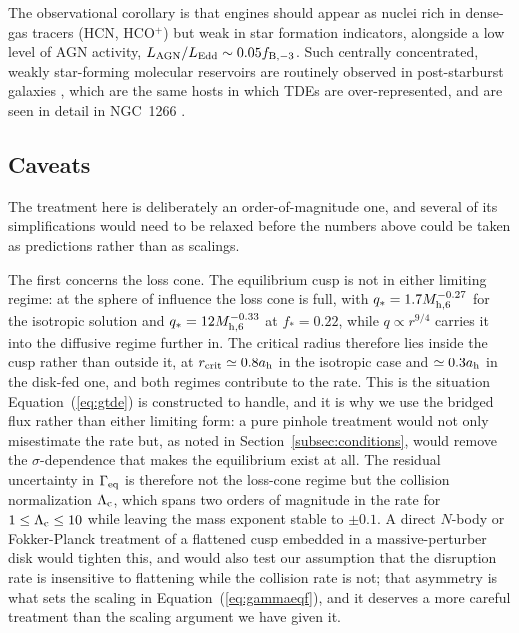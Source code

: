 \documentclass[preprint2]{aastex}
\newcommand{\mhsix}{M_{\rm h,6}\xspace}
\begin{document}
The observational corollary is that engines should appear as nuclei rich in dense-gas tracers (HCN, HCO$^{+}$) but weak in star formation indicators, alongside a low level of AGN activity, $L_{\rm AGN}/L_{\rm Edd} \sim 0.05 f_{\rm B,-3}$. Such centrally concentrated, weakly star-forming molecular reservoirs are routinely observed in post-starburst galaxies \citep{French:2015a,French:2018a,Smercina:2018a}, which are the same hosts in which TDEs are over-represented, and are seen in detail in NGC~1266 \citep{Alatalo:2011a,Alatalo:2014a,Alatalo:2015a}.

\subsection{Caveats}\label{subsec:caveats}

The treatment here is deliberately an order-of-magnitude one, and several of its simplifications would need to be relaxed before the numbers above could be taken as predictions rather than as scalings.

The first concerns the loss cone. The equilibrium cusp is not in either limiting regime: at the sphere of influence the loss cone is full, with $q_{\ast} = 1.7 \mhsix^{-0.27}$ for the isotropic solution and $q_{\ast} = 12 \mhsix^{-0.33}$ at $f_{\ast} = 0.22$, while $q \propto r^{9/4}$ carries it into the diffusive regime further in. The critical radius therefore lies inside the cusp rather than outside it, at $r_{\rm crit} \simeq 0.8 a_{\rm h}$ in the isotropic case and $\simeq 0.3 a_{\rm h}$ in the disk-fed one, and both regimes contribute to the rate. This is the situation Equation~(\ref{eq:gtde}) is constructed to handle, and it is why we use the bridged flux rather than either limiting form: a pure pinhole treatment would not only misestimate the rate but, as noted in Section~\ref{subsec:conditions}, would remove the $\sigma$-dependence that makes the equilibrium exist at all. The residual uncertainty in $\Gamma_{\rm eq}$ is therefore not the loss-cone regime but the collision normalization $\Lambda_{\rm c}$, which spans two orders of magnitude in the rate for $1 \le \Lambda_{\rm c} \le 10$ while leaving the mass exponent stable to $\pm 0.1$. A direct $N$-body or Fokker-Planck treatment of a flattened cusp embedded in a massive-perturber disk would tighten this, and would also test our assumption that the disruption rate is insensitive to flattening while the collision rate is not; that asymmetry is what sets the scaling in Equation~(\ref{eq:gammaeqf}), and it deserves a more careful treatment than the scaling argument we have given it.
\end{document}
